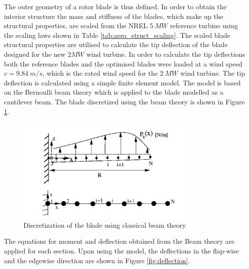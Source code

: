 The outer geometry of a rotor blade is thus defined. In order to obtain the interior structure the mass and stiffness of the blades, which make up the structural properties, are scaled from the NREL $5\ MW$ reference turbine using the scaling laws shown in Table \ref{tab:aero_struct_scaling}. The scaled blade structural properties are utilised to calculate the tip deflection of the blade designed for the new $2 MW$ wind turbine. In order to calculate the tip deflections both the reference blades and the optimised blades were loaded at a wind speed $v=9.84\ m/s$, which is the rated wind speed for the $2\ MW$ wind turbine. The tip deflection is calculated using a simple finite element model. The model is based on the Bernoulli beam theory which is applied to the blade modelled as a cantilever beam\cite{Bispl}. The blade discretized using the beam theory is shown in Figure \ref{fig:beam_theory}.

\begin{figure}[H]
\centering
\includegraphics[width=0.8\textwidth]{Images/beam_theory.PNG} 
\caption{Discretization of the blade using classical beam theory \cite{DTU_hansen}}\label{fig:beam_theory}
\end{figure}

The equations for moment and deflection obtained from the Beam theory are applied for each section. Upon using the model, the deflections in the flap-wise and the edgewise direction are shown in Figure \ref{fig:deflection}.

